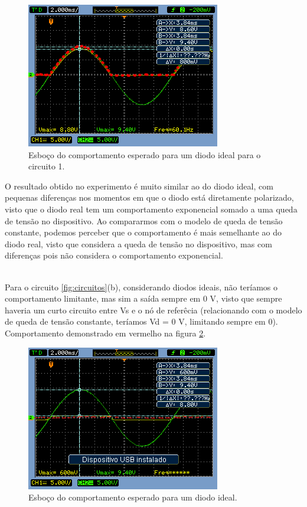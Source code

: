 \documentclass{abntex2}
\begin{document}
\begin{figure}[h]
  \centering
  \includegraphics[scale = .7]{circuito-1a-esboco.png}
  \caption{Esboço do comportamento esperado para um diodo ideal para o circuito 1.}
  \label{fig:comp1}
\end{figure}
\pagebreak
O resultado obtido no experimento é muito similar ao do diodo ideal, com pequenas diferenças nos momentos em que o diodo está diretamente polarizado, visto que o diodo real tem um comportamento exponencial somado a uma queda de tensão no dispositivo.
Ao compararmos com o modelo de queda de tensão constante, podemos perceber que o comportamento é mais semelhante ao do diodo real, visto que considera a queda de tensão no dispositivo, mas com diferenças pois não considera o comportamento exponencial.

\\Para o circuito \ref{fig:circuitos}(b), considerando diodos ideais, não teríamos o comportamento limitante, mas sim a saída sempre em 0 V, visto que sempre haveria um curto circuito entre Vs e o nó de referêcia (relacionando com o modelo de queda de tensão constante, teríamos Vd = 0 V, limitando sempre em 0). Comportamento demonstrado em vermelho na figura \ref{fig:comp2}.

\begin{figure}[h]
  \centering
  \includegraphics[scale = .7]{circuito-1b-esboco.png}
  \caption{Esboço do comportamento esperado para um diodo ideal.}
  \label{fig:comp2}
\end{figure}
\end{document}
